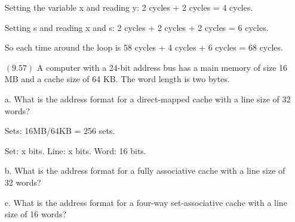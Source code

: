 \documentclass[letterpaper,10pt,titlepage]{article}
\begin{document}
\begin{enumerate}
Setting the variable x and reading y: 2 cycles + 2 cycles = 4 cycles.

Setting s and reading x and s: 2 cycles + 2 cycles + 2 cycles = 6 cycles.

So each time around the loop is 58 cycles + 4 cycles + 6 cycles = 68 cycles.


\item[$(9.57)$] A computer with a 24-bit address bus has a main memory of size 16 MB and a cache size of 64 KB. The word length is two bytes. 

a.	What is the address format for a direct-mapped cache with a line size of 32 words?

Sets: 16MB/64KB = 256 sets.

Set: x bits. Line: x bits. Word: 16 bits.


b. What is the address format for a fully associative cache with a line size of 32 words? 


c. What is the address format for a four-way set-associative cache with a line size of 16 words? 

\end{enumerate}
\end{document}
